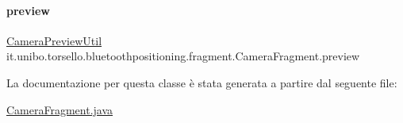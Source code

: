 \hypertarget{classit_1_1unibo_1_1torsello_1_1bluetoothpositioning_1_1fragment_1_1CameraFragment_af14f8f1e4107c9a9063cf70d1fbb5bb5_af14f8f1e4107c9a9063cf70d1fbb5bb5}{}\label{classit_1_1unibo_1_1torsello_1_1bluetoothpositioning_1_1fragment_1_1CameraFragment_af14f8f1e4107c9a9063cf70d1fbb5bb5_af14f8f1e4107c9a9063cf70d1fbb5bb5} 
\paragraph{\texorpdfstring{preview}{preview}}
{\footnotesize\ttfamily \hyperlink{classit_1_1unibo_1_1torsello_1_1bluetoothpositioning_1_1util_1_1CameraPreviewUtil}{Camera\+Preview\+Util} it.\+unibo.\+torsello.\+bluetoothpositioning.\+fragment.\+Camera\+Fragment.\+preview\hspace{0.3cm}{\ttfamily [package]}}



La documentazione per questa classe è stata generata a partire dal seguente file\+:\begin{DoxyCompactItemize}
\item 
\hyperlink{CameraFragment_8java}{Camera\+Fragment.\+java}\end{DoxyCompactItemize}

